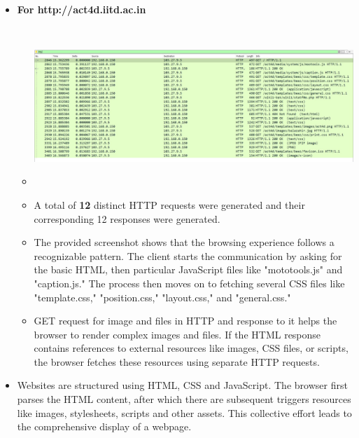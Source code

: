\documentclass{article}
\begin{document}
\begin{itemize}
\begin{itemize}
\begin{itemize}
            {iitd-http.jpeg}
            \item We can see that there is only one unique HTTP request identified.
            \item This underlines the security controls put in place by the website to protect the privacy and accuracy of data transmission.
            \end{itemize}
        \item \textbf{For http://act4d.iitd.ac.in}
        \begin{itemize}
            \item \includegraphics[width=15cm, height=6cm]
            {act4d-http.jpeg}
            \item A total of \textbf{12} distinct HTTP requests were generated and their corresponding 12 responses were generated.
            \item The provided screenshot shows that the browsing experience follows a recognizable pattern. The client starts the communication by asking for the basic HTML, then particular JavaScript files like "mototools.js" and "caption.js." The process then moves on to fetching several CSS files like "template.css," "position.css," "layout.css," and "general.css." 
            \item GET request for image and files in HTTP and response to it helps the browser to render complex images and files. If the HTML response contains references to external resources like images, CSS files, or scripts, the browser fetches these resources using separate HTTP requests.
        \end{itemize}
        \item Websites are structured using HTML, CSS and JavaScript. The browser first parses the HTML content, after which there are subsequent triggers resources like images, stylesheets, scripts and other assets. This collective effort leads to the comprehensive display of a webpage.
        \end{itemize}
        

\end{itemize}
\end{document}
